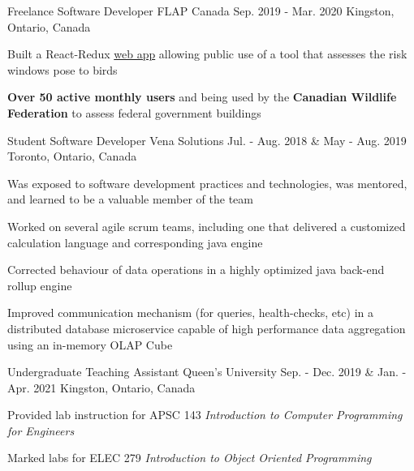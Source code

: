 \begin{cventries}
  \cventry
    {Freelance Software Developer} %
    {FLAP Canada} %
    {Sep. 2019 - Mar. 2020} %
    {Kingston, Ontario, Canada} %
    {
      \begin{cvitems} %
        \item {Built a React-Redux \href{https://www.flapapp.ca/}{web app} allowing public use of a tool that assesses the risk windows pose to birds}
        \item{\textbf{Over 50 active monthly users} and being used by the \textbf{Canadian Wildlife Federation} to assess federal government buildings}
      \end{cvitems}
    }

  \cventry
    {Student Software Developer} %
    {Vena Solutions} %
    {Jul. - Aug. 2018 \& May - Aug. 2019} %
    {Toronto, Ontario, Canada} %
    {
      \begin{cvitems} %
        \item{Was exposed to software development practices and technologies, was mentored, and learned to be a valuable member of the team}
        \item{Worked on several agile scrum teams, including one that delivered a customized calculation language and corresponding java engine}
        \item{Corrected behaviour of data operations in a highly optimized java back-end rollup engine} %
        \item{Improved communication mechanism (for queries, health-checks, etc) in a distributed database microservice capable of high performance data aggregation using an in-memory OLAP Cube}
      \end{cvitems}
    }

  \cventry
    {Undergraduate Teaching Assistant} %
    {Queen's University} %
    {Sep. - Dec. 2019 \& Jan. - Apr. 2021} %
    {Kingston, Ontario, Canada} %
    {
      \begin{cvitems} %
        \item{Provided lab instruction for APSC 143 \textit{Introduction to Computer Programming for Engineers}}
        \item{Marked labs for ELEC 279 \textit{Introduction to Object Oriented Programming}}
      \end{cvitems}
    }


\end{cventries}
